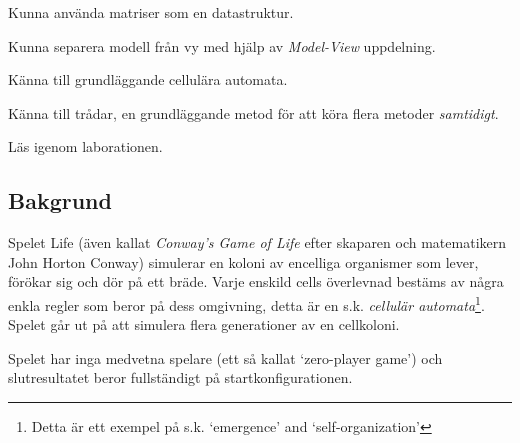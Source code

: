 

\Lab{\LabWeekTWELVE}

\begin{Goals}
    \item Kunna använda matriser som en datastruktur.
    \item Kunna separera modell från vy med hjälp av \emph{Model-View} uppdelning.
    \item Känna till grundläggande cellulära automata. %
    \item Känna till trådar, en grundläggande metod för att köra flera metoder \emph{samtidigt}.
\end{Goals}

\begin{Preparations}
    \item Läs igenom laborationen.
\end{Preparations}

\subsection{Bakgrund}

Spelet Life (även kallat \emph{Conway's Game of Life} efter skaparen och matematikern John Horton Conway) simulerar en koloni av encelliga organismer som lever, förökar sig och dör på ett bräde. Varje enskild cells överlevnad bestäms av några enkla regler som beror på dess omgivning, detta är en s.k. \emph{cellulär automata}\footnote{Detta är ett exempel på s.k. `emergence' and `self-organization'}.  Spelet går ut på att simulera flera generationer av en cellkoloni.

Spelet har inga medvetna spelare (ett så kallat `zero-player game') och slutresultatet beror fullständigt på startkonfigurationen.


